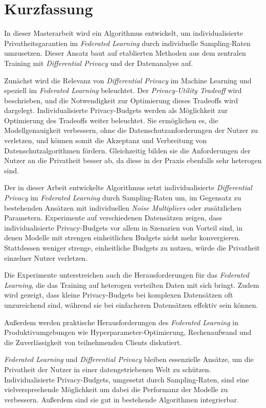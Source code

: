 \section*{Kurzfassung}\label{sec:abstract}

In dieser Masterarbeit wird ein Algorithmus entwickelt, um individualisierte Privatheitsgarantien im \textit{Federated Learning} durch individuelle Sampling-Raten umzusetzen. Dieser Ansatz baut auf etablierten Methoden aus dem zentralen Training mit \textit{Differential Privacy} und der Datenanalyse auf.  

Zunächst wird die Relevanz von \textit{Differential Privacy} im Machine Learning und speziell im \textit{Federated Learning} beleuchtet. Der \textit{Privacy-Utility Tradeoff} wird beschrieben, und die Notwendigkeit zur Optimierung dieses Tradeoffs wird dargelegt. Individualisierte Privacy-Budgets werden als Möglichkeit zur Optimierung des Tradeoffs weiter beleuchtet. Sie ermöglichen es, die Modellgenauigkeit verbessern, ohne die Datenschutzanforderungen der Nutzer zu verletzen, und können somit die Akzeptanz und Verbreitung von Datenschutzalgorithmen fördern. Gleichzeitig bilden sie die Anforderungen der Nutzer an die Privatheit besser ab, da diese in der Praxis ebenfalls sehr heterogen sind.

Der in dieser Arbeit entwickelte Algorithmus setzt individualisierte \textit{Differential Privacy} im \textit{Federated Learning} durch Sampling-Raten um, im Gegensatz zu bestehenden Ansätzen mit individuellen \textit{Noise Multipliers} oder zusätzlichen Parametern. Experimente auf verschiedenen Datensätzen zeigen, dass individualisierte Privacy-Budgets vor allem in Szenarien von Vorteil sind, in denen Modelle mit strengen einheitlichen Budgets nicht mehr konvergieren. Stattdessen weniger strenge, einheitliche Budgets zu nutzen, würde die Privatheit einzelner Nutzer verletzen.

Die Experimente unterstreichen auch die Herausforderungen für das \textit{Federated Learning}, die das Training auf heterogen verteilten Daten mit sich bringt. Zudem wird gezeigt, dass kleine Privacy-Budgets bei komplexen Datensätzen oft unzureichend sind, während sie bei einfacheren Datensätzen effektiv sein können.  

Außerdem werden praktische Herausforderungen des \textit{Federated Learning} in Produktivumgebungen wie Hyperparameter-Optimierung, Rechenaufwand und die Zuverlässigkeit von teilnehmenden Clients diskutiert.  

\textit{Federated Learning} und \textit{Differential Privacy} bleiben essenzielle Ansätze, um die Privatheit der Nutzer in einer datengetriebenen Welt zu schützen. Individualisierte Privacy-Budgets, umgesetzt durch Sampling-Raten, sind eine vielversprechende Möglichkeit um dabei die Performanz der Modelle zu verbessern. Außerdem sind sie gut in bestehende Algorithmen integrierbar.  